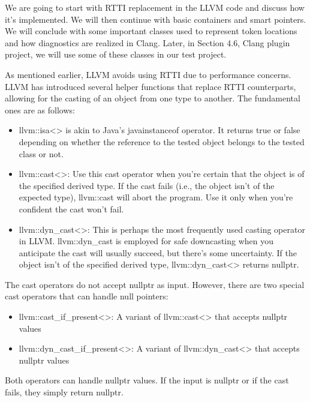 We are going to start with RTTI replacement in the LLVM code and discuss how it's implemented. We will then continue with basic containers and smart pointers. We will conclude with some important classes used to represent token locations and how diagnostics are realized in Clang. Later, in Section 4.6, Clang plugin project, we will use some of these classes in our test project.


As mentioned earlier, LLVM avoids using RTTI due to performance concerns. LLVM has introduced several helper functions that replace RTTI counterparts, allowing for the casting of an object from one type to another. The fundamental ones are as follows:

\begin{itemize}
\item
llvm::isa<> is akin to Java's javainstanceof operator. It returns true or false depending on whether the reference to the tested object belongs to the tested class or not.

\item
llvm::cast<>: Use this cast operator when you're certain that the object is of the specified derived type. If the cast fails (i.e., the object isn't of the expected type), llvm::cast will abort the program. Use it only when you're confident the cast won't fail.

\item
llvm::dyn\_cast<>: This is perhaps the most frequently used casting operator in LLVM. llvm::dyn\_cast is employed for safe downcasting when you anticipate the cast will usually succeed, but there's some uncertainty. If the object isn't of the specified derived type, llvm::dyn\_cast<> returns nullptr.
\end{itemize}

The cast operators do not accept nullptr as input. However, there are two special cast operators that can handle null pointers:

\begin{itemize}
\item
llvm::cast\_if\_present<>: A variant of llvm::cast<> that accepts nullptr values

\item
llvm::dyn\_cast\_if\_present<>: A variant of llvm::dyn\_cast<> that accepts nullptr values
\end{itemize}

Both operators can handle nullptr values. If the input is nullptr or if the cast fails, they simply return nullptr.

